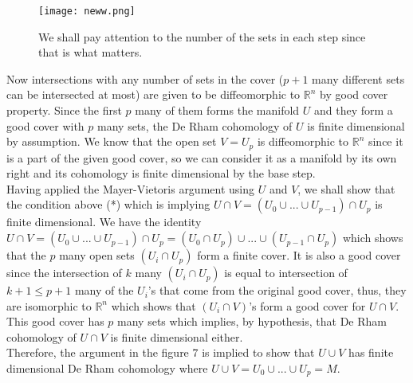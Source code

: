 \documentclass[12pt]{amsart}
\theoremstyle{remark}
\begin{document}
\begin{figure}[h]
    \centering
    \texttt{[image: neww.png]}
    \caption{We shall pay attention to the number of the sets in each step since that is what matters.}
    \label{fig:newwwww}
\end{figure} 

\indent Now intersections with any number of sets in the cover ($p+1$ many different sets can be intersected at most) are given to be diffeomorphic to $\mathbb{R}^n$ by good cover property. Since the first $p$ many of them forms the manifold $U$ and they form a good cover with $p$ many sets, the De Rham cohomology of $U$ is finite dimensional by assumption. We know that the open set $V = U_p$ is diffeomorphic to $\mathbb{R}^n$ since it is a part of the given good cover, so we can consider it as a manifold by its own right and its cohomology is finite dimensional by the base step. \\

\indent Having applied the Mayer-Vietoris argument using $U$ and $V$, we shall show that the condition above (*) which is implying $U\cap V = (U_0 \cup ... \cup U_{p-1}) \cap U_p $ is finite dimensional. We have the identity $ U\cap V = (U_0 \cup ... \cup U_{p-1}) \cap U_p = (U_0 \cap U_p) \cup ... \cup (U_{p-1} \cap U_p)$ which shows that the $p$ many open sets $(U_i \cap U_p)$ form a finite cover. It is also a good cover since the intersection of $k$ many $(U_i\cap U_p)$ is equal to intersection of $k+1 \leq p+1$ many of the $U_i$'s that come from the original good cover, thus, they are isomorphic to $\mathbb{R}^n$ which shows that $(U_i \cap V)$'s form a good cover for $U\cap V$. This good cover has $p$ many sets which implies, by hypothesis, that De Rham cohomology of $U\cap V$ is finite dimensional either. \\
\indent Therefore, the argument in the figure 7 is implied to show that $U\cup V$ has finite dimensional De Rham cohomology where $U\cup V = U_0 \cup ... \cup U_p = M.$ \\
\end{document}
